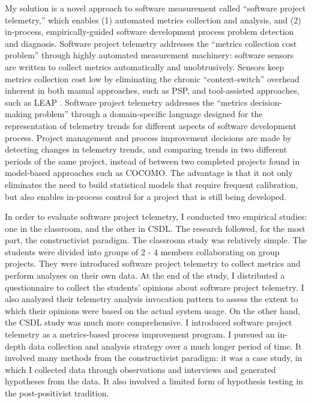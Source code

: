 My solution is a novel approach to software measurement called ``software project telemetry,'' which enables (1) automated metrics collection and analysis, and (2) in-process, empirically-guided software development process problem detection and diagnosis. 
Software project telemetry addresses the ``metrics collection cost problem'' through highly automated measurement machinery: software sensors are written to collect metrics automatically and unobtrusively. Sensors keep metrics collection cost low by eliminating the chronic ``context-switch'' overhead inherent in both manual approaches, such as PSP, and tool-assisted approaches, such as LEAP \cite{Moore:1999}.
Software project telemetry addresses the ``metrics decision-making problem'' through a domain-specific language designed for the representation of telemetry trends for different aspects of software development process. Project management and process improvement decisions are made by detecting changes in telemetry trends, and comparing trends in two different periods of the same project, instead of between two completed projects found in model-based approaches such as COCOMO. The advantage is that it not only eliminates the need to build statistical models that require frequent calibration, but also enables in-process control for a project that is still being developed.

In order to evaluate software project telemetry, I conducted two empirical studies: one in the classroom, and the other in CSDL. The research followed, for the most part, the constructivist paradigm.
The classroom study was relatively simple. The students were divided into groups of 2 - 4 members collaborating on group projects. They were introduced software project telemetry to collect metrics and perform analyses on their own data. At the end of the study, I distributed a questionnaire to collect the students' opinions about software project telemetry. I also analyzed their telemetry analysis invocation pattern to assess the extent to which their opinions were based on the actual system usage.
On the other hand, the CSDL study was much more comprehensive. I introduced software project telemetry as a metrics-based process improvement program. I pursued an in-depth data collection and analysis strategy over a much longer period of time. It involved many methods from the constructivist paradigm: it was a case study, in which I collected data through observations and interviews and generated hypotheses from the data. It also involved a limited form of hypothesis testing in the post-positivist tradition.

